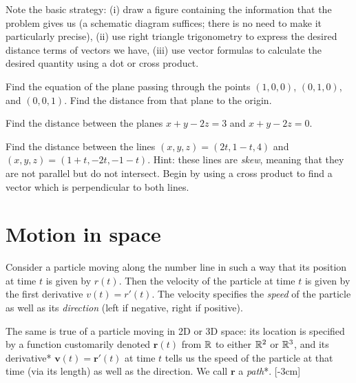 \documentclass[svgnames]{report}
\begin{document}
Note the basic strategy: (i) draw a figure containing the information that
the problem gives us (a schematic diagram suffices; there is no need
to make it particularly precise), (ii) use right triangle trigonometry to
express the desired distance terms of vectors we have, (iii) use
vector formulas to calculate the desired quantity using a dot or cross
product. 

\begin{exercise}{}{}
  Find the equation of the plane passing through the points $(1,0,0)$,
  $(0,1,0)$, and $(0,0,1)$. Find the distance from that plane to the
  origin. 
\end{exercise}

\begin{exercise}{}{}
  Find the distance between the planes $x+y-2z = 3$ and $x+y-2z = 0$. 
\end{exercise}

\begin{exercise}{}{}
  Find the distance between the lines $(x,y,z) = (2t, 1-t, 4)$ and
  $(x,y,z) = (1 + t, -2t, -1-t)$. Hint: these lines are \textit{skew},
  meaning that they are not parallel but do not intersect. Begin by
  using a cross product to find a vector which is perpendicular to
  both lines. 
\end{exercise}

\section{Motion in space}

Consider a particle moving along the number line in such a way that
its position at time $t$ is given by $r(t)$. Then the velocity of the
particle at time $t$ is given by the first derivative $v(t) =
r'(t)$. The velocity specifies the \textit{speed} of the particle as well as
its \textit{direction} (left if negative, right if positive).

The same is true of a particle moving in 2D or 3D space: its location
is specified by a function customarily denoted $\mathbf{r}(t)$ from
$\mathbb{R}$ to either $\mathbb{R}^2$ or $\mathbb{R}^3$, and its derivative*
$\mathbf{v}(t) = \mathbf{r}'(t)$ at time $t$ tells us the speed of the
particle at that time (via its length) as well as the direction. We
call $\mathbf{r}$ a \textit{path}*. [-3cm] 
\end{document}
